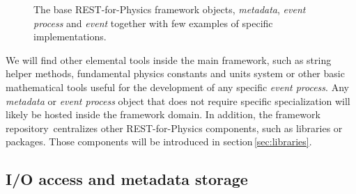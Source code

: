 \begin{figure}[]
  \centering
	\caption{The base REST-for-Physics framework objects, 
	\emph{metadata}, \emph{event process} and \emph{event} together with few examples of specific implementations.}  \label{fig:objects}
\end{figure}

We will find other elemental tools inside the main framework, such as string helper methods, fundamental physics constants and units system or other basic mathematical tools useful for the development of any specific \emph{event process}. Any \emph{metadata} or \emph{event process} object that does not require specific specialization will likely be hosted inside the framework domain.
 In addition, the framework repository\,\cite{REST_Framework_Git} centralizes other REST-for-Physics components, such as libraries or packages. Those components will be introduced in section\,\ref{sec:libraries}.%





\subsection{I/O access and metadata storage}



